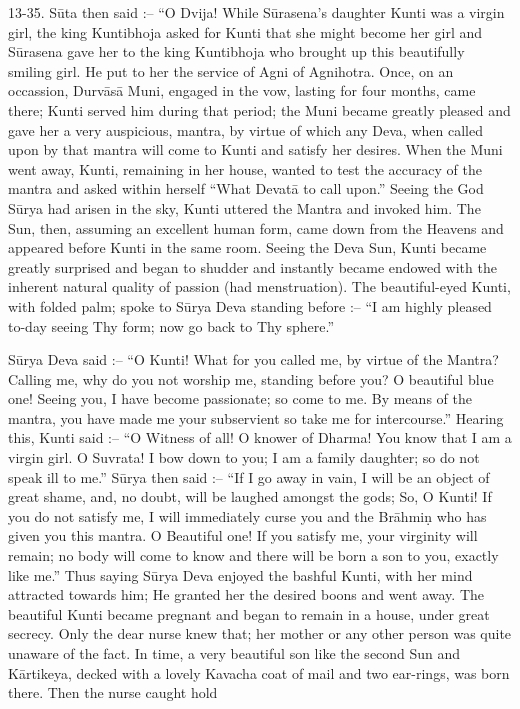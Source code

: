 13-35. S\=uta then said :-- ``O Dvija! While S\=urasena's daughter Kunti was a virgin girl, the king Kuntibhoja asked for Kunti that she might become her girl and S\=urasena gave her to the king Kuntibhoja who brought up this beautifully smiling girl. He put to her the service of Agni of Agnihotra. Once, on an occassion, Durv\=as\=a Muni, engaged in the vow, lasting for four months, came there; Kunti served him during that period; the Muni became greatly pleased and gave her a very auspicious, mantra, by virtue of which any Deva, when called upon by that mantra will come to Kunti and satisfy her desires. When the Muni went away, Kunti, remaining in her house, wanted to test the accuracy of the mantra and asked within herself ``What Devat\=a to call upon.'' Seeing the God S\=urya had arisen in the sky, Kunti uttered the Mantra and invoked him. The Sun, then, assuming an excellent human form, came down from the Heavens and appeared before Kunti in the same room. Seeing the Deva Sun, Kunti became greatly surprised and began to shudder and instantly became endowed with the inherent natural quality of passion (had menstruation). The beautiful-eyed Kunti, with folded palm; spoke to S\=urya Deva standing before :-- ``I am highly pleased to-day seeing Thy form; now go back to Thy sphere.''

S\=urya Deva said :-- ``O Kunti! What for you called me, by virtue of the Mantra? Calling me, why do you not worship me, standing before you? O beautiful blue one! Seeing you, I have become passionate; so come to me. By means of the mantra, you have made me your subservient so take me for intercourse.'' Hearing this, Kunti said :-- ``O Witness of all! O knower of Dharma! You know that I am a virgin girl. O Suvrata! I bow down to you; I am a family daughter; so do not speak ill to me.'' S\=urya then said :-- ``If I go away in vain, I will be an object of great shame, and, no doubt, will be laughed amongst the gods; So, O Kunti! If you do not satisfy me, I will immediately curse you and the Br\=ahmi\d{n} who has given you this mantra. O Beautiful one! If you satisfy me, your virginity will remain; no body will come to know and there will be born a son to you, exactly like me.'' Thus saying S\=urya Deva enjoyed the bashful Kunti, with her mind attracted towards him; He granted her the desired boons and went away. The beautiful Kunti became pregnant and began to remain in a house, under great secrecy. Only the dear nurse knew that; her mother or any other person was quite unaware of the fact. In time, a very beautiful son like the second Sun and K\=artikeya, decked with a lovely Kavacha coat of mail and two ear-rings, was born there. Then the nurse caught hold


